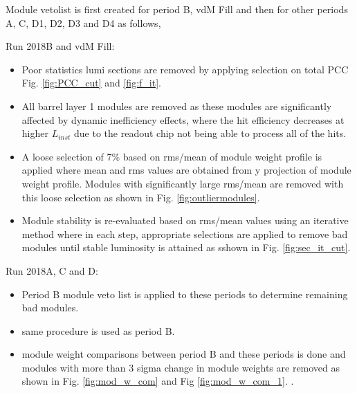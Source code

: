 Module vetolist is first created for period B, vdM Fill and then for other periods A, C, D1, D2, D3 and D4 as follows, 

Run 2018B and vdM Fill:
\begin{itemize}

\item Poor statistics lumi sections are removed by applying selection on total PCC Fig. \ref{fig:PCC_cut} and \ref{fig:f_it}.

\item All barrel layer 1 modules are removed as these modules are significantly affected by dynamic inefficiency effects, where the hit efficiency decreases at higher $L_{inst}$ due to the readout chip not being able to process all of the hits.                                                                              
\item A loose selection of 7\% based on rms/mean of module weight profile is applied where mean and rms values are obtained from y projection of module weight profile. Modules with significantly large rms/mean are removed with this loose selection as shown in Fig. \ref{fig:outliermodules}. 

\item Module stability is re-evaluated based on rms/mean values using an iterative method where in each step, appropriate selections are applied to remove bad modules until stable luminosity is attained as sshown in Fig. \ref{fig:sec_it_cut}.                                                      
\end{itemize}

Run 2018A, C and D:                                                                      
\begin{itemize}  

\item Period B module veto list is applied to these periods to determine remaining bad modules.

\item same procedure is used as period B. 

\item module weight comparisons between period B and these periods is done and modules with more than 3 sigma change in module weights are removed as shown in Fig. \ref{fig:mod_w_com} and Fig \ref{fig:mod_w_com_1}.      .                                                                             
\end{itemize}


